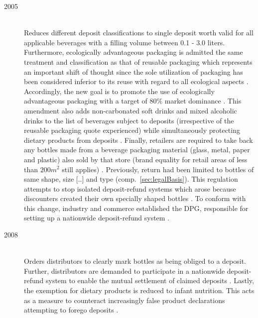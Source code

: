 \begin{description}
	\item[2005]\label{itm:2005amendment}
	\hfill \\
	Reduces different deposit classifications to single deposit worth  valid for all applicable beverages with a filling volume between 0.1 - 3.0 liters. Furthermore, \gls{ecologically advantageous packaging} is admitted the same treatment and classification as that of reusable packaging which represents an important shift of thought since the sole utilization of packaging has been considered inferior to its reuse with regard to all ecological aspects  \cite[p.~7]{Hartlep2011Recycling}. Accordingly, the new goal is to promote the use of ecologically advantageous packaging with a target of 80\% market dominance \cite[§~1]{verpackV2008}. This amendment also adds non-carbonated soft drinks and mixed alcoholic drinks to the list of beverages subject to deposits (irrespective of the reusable packaging quote experienced) while simultaneously protecting dietary products from deposits \cite[p.~1408]{verpackV2005} \cite[p.~171]{Flanderka/Stroetmann2009}. Finally, retailers are required to take back any bottles made from a beverage packaging material (glass, metal, paper and plastic) also sold by that store (brand equality for retail areas of less than $200m^2$ still applies)  \cite[p.~11]{Hartlep2011Recycling}. Previously, return had been limited to bottles of same shape, size [..] and type (comp.~\ref{sec:legalBasis}). This regulation attempts to stop isolated deposit-refund systems which arose because discounters created their own specially shaped bottles \cite[p.~168]{Flanderka/Stroetmann2009}. To conform with this change, industry and commerce established the \acl{DPG}, responsible for setting up a nationwide deposit-refund system  \cite[p.~8]{Hartlep2011Recycling}.
	
	\item[2008]
	\hfill \\
	Orders distributors to clearly mark bottles as being obliged to a deposit. Further, distributors are demanded to participate in a nationwide deposit-refund system to enable the mutual settlement of claimed deposits \cite[§~9]{verpackV2008}. Lastly, the exemption for dietary products is reduced to infant nutrition. This acts as a measure to counteract increasingly false product declarations attempting to forego deposits \cite[pp.~531]{verpackV2008} \cite[p.~171]{Flanderka/Stroetmann2009}.
\end{description}

